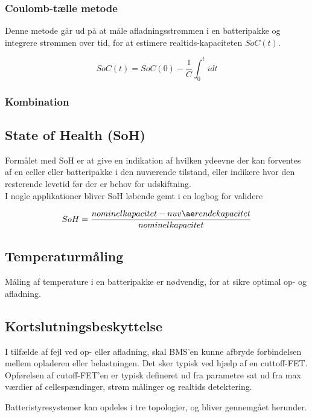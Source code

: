 \subsubsection{Coulomb-tælle metode}
Denne metode går ud på at måle afladningsstrømmen i en batteripakke og integrere strømmen over tid, for at estimere realtids-kapaciteten $SoC(t)$. 


\begin {equation} 
SoC(t) = SoC(0) - \frac{1}{C} \int_{0}^{t} idt  \label{eq:coulomb-count}
\end {equation}


\subsubsection{Kombination}


\subsection{State of Health (SoH)}
Formålet med SoH er at give en indikation af hvilken ydeevne der kan forventes af en celler eller batteripakke i den nuværende tilstand, eller indikere hvor den resterende levetid før der er behov for udskiftning.
\\
I nogle applikationer bliver SoH løbende gemt i en logbog for validere

\begin {equation} 
SoH = \frac{nominel \space kapacitet - nuværende  kapacitet}{nominel kapacitet} \label{eq:soh}
\end {equation}


\subsection{Temperaturmåling}
Måling af temperature i en batteripakke er nødvendig, for at sikre optimal op- og afladning. 

\subsection{Kortslutningsbeskyttelse}
I tilfælde af fejl ved op- eller afladning, skal BMS'en kunne afbryde forbindelsen mellem opladeren eller belastningen. Det sker typisk ved hjælp af en cuttoff-FET. Opførelsen af cutoff-FET'en er typisk defineret ud fra parametre sat ud fra max værdier af cellespændinger, strøm målinger og realtids detektering. 

Batteristyresystemer kan opdeles i tre topologier, og bliver gennemgået herunder.
